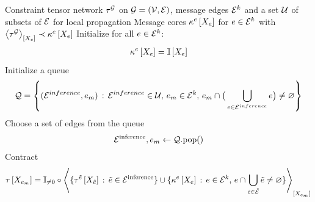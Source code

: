 

\begin{algorithm}[hbt!]
    \caption{Constraint Propagation}\label{alg:knowledgePropagation}
    \begin{algorithmic}
        \Require Constraint tensor network $\tau^{\mathcal{G}}$ on $\mathcal{G}=(\mathcal{V},\mathcal{E})$, message edges $\mathcal{E}^{k}$ and a set $\mathcal{U}$ of subsets of $\mathcal{E}$ for local propagation
        \Ensure Message cores $\kappa^{e}\left[X_{e}\right]$ for $e\in\mathcal{E}^{k}$ with $\left\langle \tau^{\mathcal{G}}\right\rangle_{\left[ X_{e} \right]}\prec\kappa^{e}\left[X_{e}\right]$
        \iosepline
        \State
        \State Initialize for all $e\in\mathcal{E}^{k}$:
        \begin{align*}
            \kappa^{e}\left[X_{e}\right]
            =\mathbb{I}\left[X_{e}\right]
        \end{align*}
        \State Initialize a queue
        \begin{align*}
            \mathcal{Q} =
            \left\{
                (\mathcal{E}^{inference},e_{m}) \,:\, \mathcal{E}^{inference}\in\mathcal{U} ,\, e_{m}\in\mathcal{E}^{k} ,\, e_{m} \cap \big(\bigcup_{e\in\mathcal{E}^{inference}}e\big) \neq \varnothing
            \right\}
        \end{align*}
            \State Choose a set of edges from the queue
            \begin{align*}
                \mathcal{E}^{\mathrm{inference}},e_{m} \leftarrow \mathcal{Q}\mathrm{.pop()}
            \end{align*}
            \State Contract
            \begin{align*}
                \tau\left[X_{e_{m}}\right]
                = \mathbb{I}_{\neq0}\circ
                \left\langle 
                    \{\tau^{\tilde{e}}\left[X_{\tilde{e}}\right]\,:\,\tilde{e}\in\mathcal{E}^{\mathrm{inference}}\}
                    \cup \{\kappa^{e}\left[X_{e}\right]\,:\,e \in \mathcal{E}^{k} , \, e\cap\bigcup_{\tilde{e}\in\tilde{\mathcal{E}}}\tilde{e}\neq\varnothing \}
                \right\rangle_{\left[ X_{e_{m}} \right]}
            \end{align*}


\end{algorithmic}
\end{algorithm}
